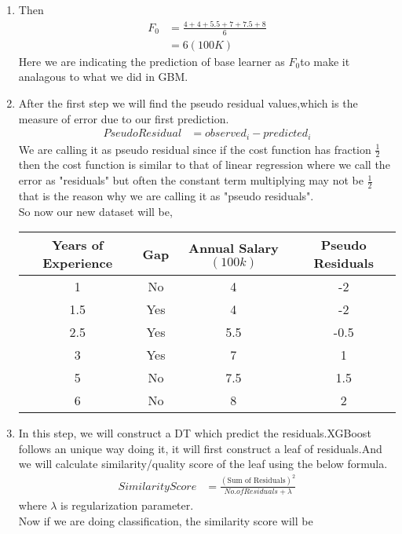 \documentclass[journal,12pt,onecolumn]{IEEEtran}
\providecommand{\brak}[1]{\ensuremath{\left(#1\right)}}
\theoremstyle{remark}
\numberwithin{equation}{section}
\begin{document}
	\begin{enumerate}
         \item Then 
		 \begin{align}
			 F_{0} &= \frac{4 + 4 + 5.5 + 7 + 7.5 + 8}{6}\\
			       &= 6\brak{100K}
		 \end{align}
		Here we are indicating the prediction of base learner as $F_{0}$to make it analagous to what we did in GBM.
	 \item After the first step we will find the pseudo residual values,which is the measure of error due to our first prediction.
		 \begin{align}
			 Pseudo Residual &= observed_i - predicted_i
		 \end{align}
			We are calling it as pseudo residual since if the cost function has fraction $\frac{1}{2}$ then the cost function is similar to that of linear regression where we call the error as "residuals" but often the constant term multiplying may not be $\frac{1}{2}$ that is the reason why we are calling it as "pseudo residuals".\\
	So now our new dataset will be,\\
	     \begin{tabular}{cccc}
	       Years of Experience & Gap & Annual Salary$\brak{100k}$ & Pseudo Residuals \\
		     \hline
		     1 & No & 4 & -2 \\
		     1.5 & Yes & 4 & -2 \\
		     2.5 & Yes & 5.5 & -0.5 \\
		     3 & Yes & 7 & 1 \\ 
		     5 & No & 7.5 & 1.5 \\
		     6 & No & 8  & 2 \\
	      \end{tabular}
         \item In this step, we will construct a DT which predict the residuals.XGBoost follows an unique way doing it, it will first construct a leaf of residuals.And we will calculate similarity/quality score of the leaf using the below formula.
		 \begin{align}
			 Similarity Score &= \frac{\brak{\text{Sum of Residuals}}^2}{No. of Residuals + \lambda}
	         \end{align}
			where $\lambda$ is regularization parameter.\\
		Now if we are doing classification, the similarity score will be
		 \begin{align}

\end{align}
\end{enumerate}
\end{document}
